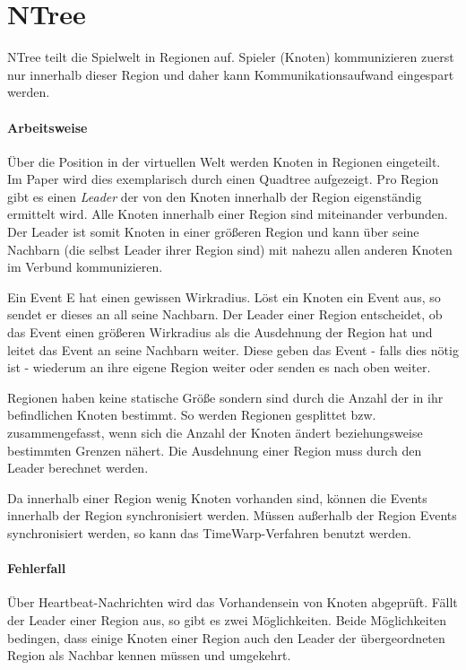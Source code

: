 \section*{NTree}
\label{chap:related:ntree}
NTree teilt die Spielwelt in Regionen auf. Spieler (Knoten) kommunizieren zuerst nur innerhalb dieser Region und daher kann Kommunikationsaufwand eingespart werden.

\cite{GauthierDickey2005Using}

\paragraph{Arbeitsweise}
Über die Position in der virtuellen Welt werden Knoten in Regionen eingeteilt. Im Paper wird dies exemplarisch durch einen Quadtree aufgezeigt. Pro Region gibt es einen \emph{Leader} der von den Knoten innerhalb der Region eigenständig ermittelt wird. Alle Knoten innerhalb einer Region sind miteinander verbunden. Der Leader ist somit Knoten in einer größeren Region und kann über seine Nachbarn (die selbst Leader ihrer Region sind) mit nahezu allen anderen Knoten im Verbund kommunizieren.

Ein Event E hat einen gewissen Wirkradius.
Löst ein Knoten ein Event aus, so sendet er dieses an all seine Nachbarn. Der Leader einer Region entscheidet, ob das Event einen größeren Wirkradius als die Ausdehnung der Region hat und leitet das Event an seine Nachbarn weiter. Diese geben das Event - falls dies nötig ist - wiederum an ihre eigene Region weiter oder senden es nach oben weiter.

Regionen haben keine statische Größe sondern sind durch die Anzahl der in ihr befindlichen Knoten bestimmt. So werden Regionen gesplittet bzw. zusammengefasst, wenn sich die Anzahl der Knoten ändert beziehungsweise bestimmten Grenzen nähert. Die Ausdehnung einer Region muss durch den Leader berechnet werden.

Da innerhalb einer Region wenig Knoten vorhanden sind, können die Events innerhalb der Region synchronisiert werden. Müssen außerhalb der Region Events synchronisiert werden, so kann das TimeWarp-Verfahren benutzt werden.


\paragraph{Fehlerfall}
Über Heartbeat-Nachrichten wird das Vorhandensein von Knoten abgeprüft. Fällt der Leader einer Region aus, so gibt es zwei Möglichkeiten. Beide Möglichkeiten bedingen, dass einige Knoten einer Region auch den Leader der übergeordneten Region als Nachbar kennen müssen und umgekehrt.

